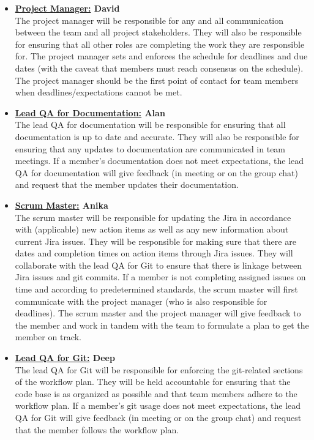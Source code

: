 \documentclass{article}
\begin{document}
\begin{itemize}
	\item \textbf{\underline{Project Manager:} David} \\
	The project manager will be responsible for any and all communication between the team and all project stakeholders. 
	They will also be responsible for ensuring that all other roles are completing the work they are responsible for. 
	The project manager sets and enforces the schedule for deadlines and due dates (with the caveat that members must reach consensus on the schedule). 
	The project manager should be the first point of contact for team members when deadlines/expectations cannot be met. 

	\item \textbf{\underline{Lead QA for Documentation:} Alan} \\
	The lead QA for documentation will be responsible for ensuring that all documentation is up to date and accurate.
	They will also be responsible for ensuring that any updates to documentation are communicated in team meetings. 
	If a member's documentation does not meet expectations, the lead QA for documentation will give feedback (in meeting or on the group chat) 
	and request that the member updates their documentation.\\
	
	\item \textbf{\underline{Scrum Master:} Anika} \\
	The scrum master will be responsible for updating the Jira in accordance with (applicable) new action items as well as any new information about current Jira issues. 
	They will be responsible for making sure that there are dates and completion times on action items through Jira issues. 
	They will collaborate with the lead QA for Git to ensure that there is linkage between Jira issues and git commits. 
	If a member is not completing assigned issues on time and according to predetermined standards, the scrum master will first 
	communicate with the project manager (who is also responsible for deadlines).
	The scrum master and the project manager will give feedback to the member and work in tandem with the team to formulate a plan to get the member on track.\\

	\item \textbf{\underline{Lead QA for Git:} Deep} \\
	The lead QA for Git will be responsible for enforcing the git-related sections of the workflow plan. 
	They will be held accountable for ensuring that the code base is as organized as possible and that team members adhere to the workflow plan.
	If a member's git usage does not meet expectations, the lead QA for Git will give feedback (in meeting or on the group chat) and request that the member follows the workflow plan.\\


\end{itemize}
\end{document}
